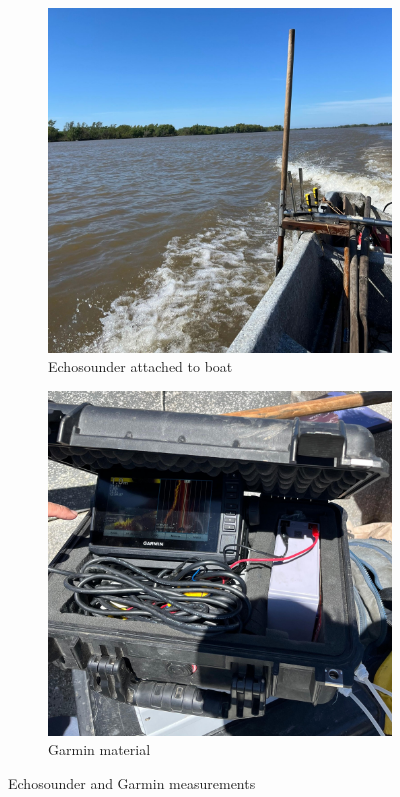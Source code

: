 \begin{figure}[H]
    \centering
    \begin{subfigure}[b]{0.48\textwidth}
        \includegraphics[width=\linewidth]{figures/ch4/Echosounder.jpg}
        \caption{Echosounder attached to boat}
        
    \end{subfigure}
    \hfill
    \begin{subfigure}[b]{0.48\textwidth}
        \includegraphics[width=\linewidth]{figures/ch4/garmin.jpg}
        \caption{Garmin material}
        
    \end{subfigure}
    \caption{Echosounder and Garmin measurements}
    \label{fig:Garmin}
\end{figure}

